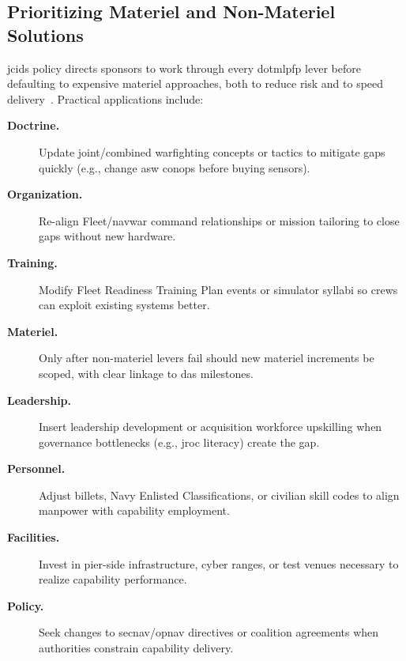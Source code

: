 \documentclass[../main.tex]{subfiles}
\begin{document}
\subsection{Prioritizing Materiel and Non-Materiel Solutions}
\Ac{jcids} policy directs sponsors to work through every \ac{dotmlpfp} lever before defaulting to expensive materiel approaches, both to reduce risk and to speed delivery~\autocite{jcids-manual-2021}. Practical applications include:
\begin{description}
	\item[\textbf{Doctrine.}] Update joint/combined warfighting concepts or tactics to mitigate gaps quickly (e.g., change \ac{asw} \ac{conops} before buying sensors).
	\item[\textbf{Organization.}] Re-align Fleet/\ac{navwar} command relationships or mission tailoring to close gaps without new hardware.
	\item[\textbf{Training.}] Modify Fleet Readiness Training Plan events or simulator syllabi so crews can exploit existing systems better.
	\item[\textbf{Materiel.}] Only after non-materiel levers fail should new materiel increments be scoped, with clear linkage to \ac{das} milestones.
	\item[\textbf{Leadership.}] Insert leadership development or acquisition workforce upskilling when governance bottlenecks (e.g., \ac{jroc} literacy) create the gap.
	\item[\textbf{Personnel.}] Adjust billets, Navy Enlisted Classifications, or civilian skill codes to align manpower with capability employment.
	\item[\textbf{Facilities.}] Invest in pier-side infrastructure, cyber ranges, or test venues necessary to realize capability performance.
	\item[\textbf{Policy.}] Seek changes to \ac{secnav}/\ac{opnav} directives or coalition agreements when authorities constrain capability delivery.
\end{description}
\end{document}
